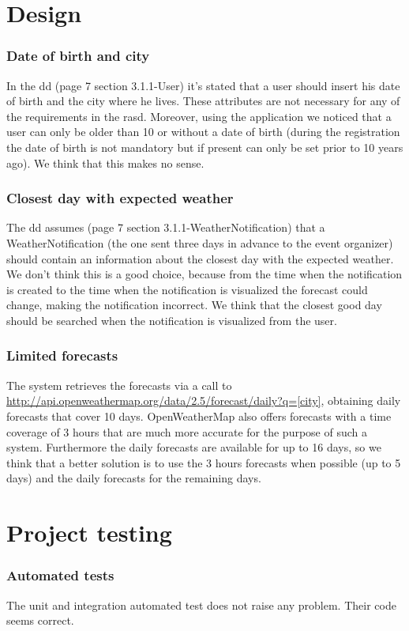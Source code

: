 \documentclass[10pt,a4paper,titlepage]{article}
\begin{document}
\part{Design}
\label{part2}
\section{Date of birth and city}
In the dd (page 7 section 3.1.1-User) it's stated that a user should insert his date of birth and the city where he lives. These attributes are not necessary for any of the requirements in the rasd. Moreover, using the application we noticed that a user can only be older than 10 or without a date of birth (during the registration the date of birth is not mandatory but if present can only be set prior to 10 years ago). We think that this makes no sense.

\section{Closest day with expected weather}
The dd assumes (page 7 section 3.1.1-WeatherNotification) that a WeatherNotification (the one sent three days in advance to the event organizer) should contain an information about the closest day with the expected weather.
We don't think this is a good choice, because from the time when the notification is created to the time when the notification is visualized the forecast could change, making the notification incorrect. We think that the closest good day should be searched when the notification is visualized from the user.

\section{Limited forecasts}
The system retrieves the forecasts via a call to \url{http://api.openweathermap.org/data/2.5/forecast/daily?q=[city]}, obtaining daily forecasts that cover 10 days. OpenWeatherMap also offers forecasts with a time coverage of 3 hours that are much more accurate for the purpose of such a system. Furthermore the daily forecasts are available for up to 16 days, so we think that a better solution is to use the 3 hours forecasts when possible (up to 5 days) and the daily forecasts for the remaining days.

\pagebreak
\part{Project testing}
\label{part3}
\section{Automated tests}
The unit and integration automated test does not raise any problem. Their code seems correct.
\end{document}
